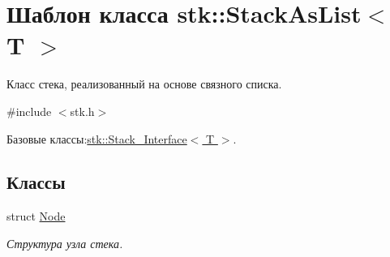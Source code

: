 \hypertarget{classstk_1_1_stack_as_list}{}\section{Шаблон класса stk\+:\+:Stack\+As\+List$<$ T $>$}
\label{classstk_1_1_stack_as_list}


Класс стека, реализованный на основе связного списка.  




{\ttfamily \#include $<$stk.\+h$>$}



Базовые классы\+:\hyperlink{classstk_1_1_stack___interface}{stk\+::\+Stack\+\_\+\+Interface$<$ T $>$}.

\subsection*{Классы}
\begin{DoxyCompactItemize}
\item 
struct \hyperlink{structstk_1_1_stack_as_list_1_1_node}{Node}
\begin{DoxyCompactList}\small\item\em Структура узла стека. \end{DoxyCompactList}\end{DoxyCompactItemize}
